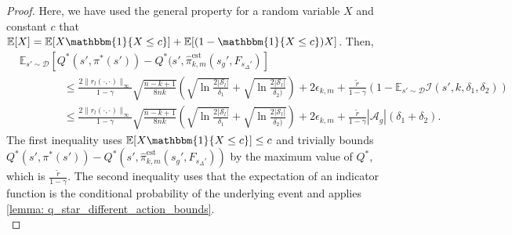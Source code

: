 \documentclass{article}
\theoremstyle{plain}
\theoremstyle{definition}
\def\est{\mathrm{est}}
\def\E{\mathbb{E}}
\begin{document}
\begin{proof}
Here, we have used the general property for a random variable $X$ and constant $c$ that $\E[X]=\E[X\mathbbm{1}\{X\leq c\}] + \E[(1-\mathbbm{1}\{X\leq c\})X]$. 
Then,
\begin{align*}
    &\E_{s'\sim \mathcal{D}}[Q^*(s',\pi^*(s')) -{Q}^*(s', \hat{\pi}_{k,m}^{\est}(s_g',F_{s_\Delta'})] \\
    &\quad\quad\quad\quad\leq \frac{2\|r_l(\cdot,\cdot)\|_\infty}{1-\gamma}\sqrt{\frac{n-k+1}{8nk}}\left(\sqrt{\ln\frac{2|\mathcal{S}_l|}{\delta_1}} + \sqrt{\ln\frac{2|\mathcal{S}_l|}{\delta_2)}}\right) + 2\epsilon_{k,m} +  \frac{\tilde{r}}{1-\gamma}\left(1-\E_{s'\sim\mathcal{D}} \mathcal{I}(s',k,\delta_1,\delta_2)\right)\\
    &\quad\quad\quad\quad \leq \frac{2\|r_l(\cdot,\cdot)\|_\infty}{1-\gamma}\sqrt{\frac{n-k+1}{8nk}}\left(\sqrt{\ln\frac{2|\mathcal{S}_l|}{\delta_1}} + \sqrt{\ln\frac{2|\mathcal{S}_l|}{\delta_2)}}\right) + 2\epsilon_{k,m}  +  \frac{\tilde{r}}{1-\gamma}|\mathcal{A}_g|(\delta_1 + \delta_2) .
\end{align*} The first inequality uses  $\E[X\mathbbm{1}\{X\leq c\}] \leq c$ and trivially bounds $Q^*(s',\pi^*(s')) - Q^*(s',\hat{\pi}_{k,m}^{\est}(s_g',F_{s_\Delta'}))$ by the maximum value of $Q^*$, which is $\frac{\tilde{r}}{1-\gamma}$. The second inequality uses that the expectation of an indicator function is the conditional probability of the underlying event and applies \cref{lemma: q_star_different_action_bounds}.\qedhere\\
\end{proof}
\end{document}
